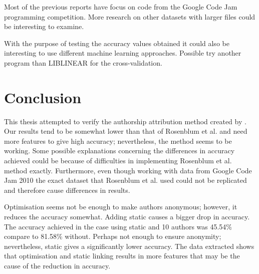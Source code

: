 \documentclass[a4paper,11pt]{kth-mag}
\begin{document}
Most of the previous reports have focus on code from the Google Code Jam
programming competition. More research on other datasets with larger files
could be interesting to examine.

With the purpose of testing the accuracy values obtained it could also be
interesting to use different machine learning approaches. Possible try another
program than LIBLINEAR for the cross-validation.

\chapter{Conclusion}
This thesis attempted to verify the authorship attribution method created by
\parencite{rosenblum2011wrote}. Our results tend to be somewhat lower than that
of Rosenblum et al. and need more features to give high accuracy; nevertheless,
the method seems to be working. Some possible explanations concerning the
differences in accuracy achieved could be because of difficulties in
implementing Rosenblum et al. method exactly. Furthermore, even though working
with data from Google Code Jam 2010 the exact dataset that Rosenblum et al.
used could not be replicated and therefore cause differences in results. 

Optimisation seems not be enough to make authors anonymous; however, it reduces
the accuracy somewhat. Adding static causes a bigger drop in accuracy. The
accuracy achieved in the case using static and 10 authors was 45.54\% compare
to 81.58\% without. Perhaps not enough to ensure anonymity; nevertheless,
static gives a significantly lower accuracy. The data extracted shows that
optimisation and static linking results in more features that may be the cause
of the reduction in accuracy.

\printbibheading
\printbibliography
\end{document}

